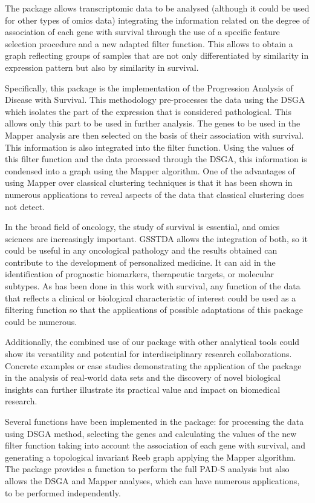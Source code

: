 The  package allows transcriptomic data to be analysed (although it could be used for other types of omics data) integrating the information related on the degree of association of each gene with survival through the use of a specific feature selection procedure and a new adapted filter function. This allows to obtain a graph reflecting groups of samples that are not only differentiated by similarity in expression pattern but also by similarity in survival.

Specifically, this package is the implementation of the Progression Analysis of Disease with Survival. This methodology pre-processes the data using the DSGA which isolates the part of the expression that is considered pathological. This allows only this part to be used in further analysis. The genes to be used in the Mapper analysis are then selected on the basis of their association with survival. This information is also integrated into the filter function. Using the values of this filter function and the data processed through the DSGA, this information is condensed into a graph using the Mapper algorithm. One of the advantages of using Mapper over classical clustering techniques is that it has been shown in numerous applications to reveal aspects of the data that classical clustering does not detect.

In the broad field of oncology, the study of survival is essential, and omics sciences are increasingly important. GSSTDA allows the integration of both, so it could be useful in any oncological pathology and the results obtained can contribute to the development of personalized medicine. It can aid in the identification of prognostic biomarkers, therapeutic targets, or molecular subtypes. As has been done in this work with survival, any function of the data that reflects a clinical or biological characteristic of interest could be used as a filtering function so that the applications of possible adaptations of this package could be numerous.

Additionally, the combined use of our package with other analytical tools could show its versatility and potential for interdisciplinary research collaborations. Concrete examples or case studies demonstrating the application of the package in the analysis of real-world data sets and the discovery of novel biological insights can further illustrate its practical value and impact on biomedical research.

Several functions have been implemented in the  package: for processing the data using DSGA method, selecting the genes and calculating the values of the new filter function taking into account the association of each gene with survival, and generating a topological invariant Reeb graph applying the Mapper algorithm. The package provides a function to perform the full PAD-S analysis but also allows the DSGA and Mapper analyses, which can have numerous applications, to be performed independently.

